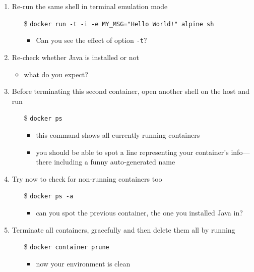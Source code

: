 \documentclass{beamer}\mode<presentation>{\usetheme{AMSBolognaFC}}
\begin{document}
\begin{frame}[allowframebreaks]
\begin{enumerate}
        \item Re-run the same shell in terminal emulation mode
        \begin{itemize}
            \item[\$] \texttt{docker run \alert{-t} -i -e MY\_MSG="Hello World!" alpine sh}
            \begin{itemize}
                \item Can you see the effect of option \texttt{-t}?
            \end{itemize}
        \end{itemize}

        \item Re-check whether Java is installed or not
        \begin{itemize}
            \item what do you expect?
        \end{itemize}

        \framebreak

        \item \alert{Before terminating this second container}, open another shell \alert{on the host} and run
        \begin{itemize}
            \item[\$] \texttt{docker \alert{ps}}
            \begin{itemize}
                \item this command shows all \alert{currently} running containers
                \item you should be able to spot a line representing your container's info---there including a funny auto-generated name
            \end{itemize}
        \end{itemize}

        \item Try now to check for non-running containers too
        \begin{itemize}
            \item[\$] \texttt{docker ps \alert{-a}}
            \begin{itemize}
                \item can you spot the previous container, the one you installed Java in?
            \end{itemize}
        \end{itemize}

        \item Terminate all containers, gracefully and then delete them all by running
        \begin{itemize}
            \item[\$] \texttt{docker container \alert{prune}}
            \begin{itemize}
                \item now your environment is clean
            \end{itemize}
        \end{itemize}


\end{enumerate}
\end{frame}
\end{document}
